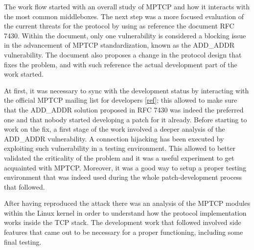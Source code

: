 The work flow started with an overall study of MPTCP and how it interacts with the most common middleboxes. The next step was a more focused evaluation of the current threats for the protocol by using as reference the document RFC 7430. Within the document, only one vulnerability is considered a blocking issue in the advancement of MPTCP standardization, known as the ADD\_ADDR vulnerability. The document also proposes a change in the protocol design that fixes the problem, and with such reference the actual development part of the work started.


At first, it was necessary to sync with the development status by interacting with the official MPTCP mailing list for developers [\href{https://listes-2.sipr.ucl.ac.be/sympa}{ref}]; this allowed to make sure that the ADD\_ADDR solution proposed in RFC 7430 was indeed the preferred one and that nobody started developing a patch for it already.
Before starting to work on the fix, a first stage of the work involved a deeper analysis of the ADD\_ADDR vulnerability. A connection hijacking has been executed by exploiting such vulnerability in a testing environment. This allowed to better validated the criticality of the problem and it was a useful experiment to get acquainted with MPTCP. Moreover, it was a good way to setup a proper testing environment that was indeed used during the whole patch-development process that followed.


After having reproduced the attack there was an analysis of the MPTCP modules within the Linux kernel in order to understand how the protocol implementation works inside the TCP stack. The development work that followed involved side features that came out to be necessary for a proper functioning, including some final testing.